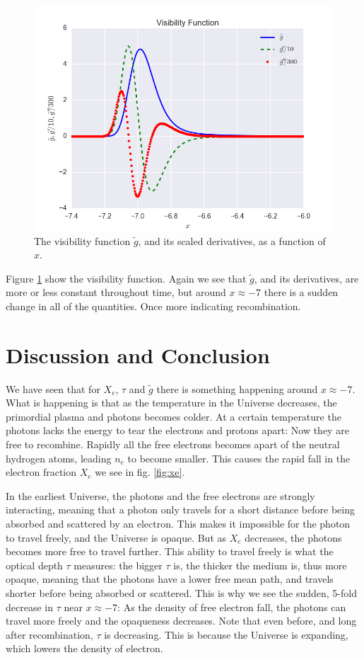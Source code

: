 \documentclass[a4paper,norsk, 10pt]{article}
\begin{document}
\begin{figure}[!htb]
\centering
\includegraphics[scale=0.5]{g.png}
\caption{The visibility function $\tilde{g}$, and its scaled derivatives, as a function of $x$.}\label{fig:g}
\end{figure}

Figure \ref{fig:g} show the visibility function. Again we see that $\tilde{g}$, and its derivatives, are more or less constant throughout time, but around $x\approx -7$ there is a sudden change in all of the quantities. Once more indicating recombination.



\section{Discussion and Conclusion}
We have seen that for $X_e$, $\tau$ and $\tilde{g}$ there is something happening around $x\approx -7$. What is happening is that as the temperature in the Universe decreases, the primordial plasma and photons becomes colder. At a certain temperature the photons lacks the energy to tear the electrons and protons apart: Now they are free to recombine. Rapidly all the free electrons becomes apart of the neutral hydrogen atoms, leading $n_e$ to become smaller. This causes the rapid fall in the electron fraction $X_e$ we see in fig. \ref{fig:xe}.

In the earliest Universe, the photons and the free electrons are strongly interacting, meaning that a photon only travels for a short distance before being absorbed and scattered by an electron. This makes it impossible for the photon to travel freely, and the Universe is opaque. But as $X_e$ decreases, the photons becomes more free to travel further. This ability to travel freely is what the optical depth $\tau$ measures: the bigger $\tau$ is, the thicker the medium is, thus more opaque, meaning that the photons have a lower free mean path, and travels shorter before being absorbed or scattered. This is why we see the sudden, 5-fold decrease in $\tau$ near $x\approx -7$: As the density of free electron fall, the photons can travel more freely and the opaqueness decreases. Note that even before, and long after recombination, $\tau$ is decreasing. This is because the Universe is expanding, which lowers the density of electron.
\end{document}

